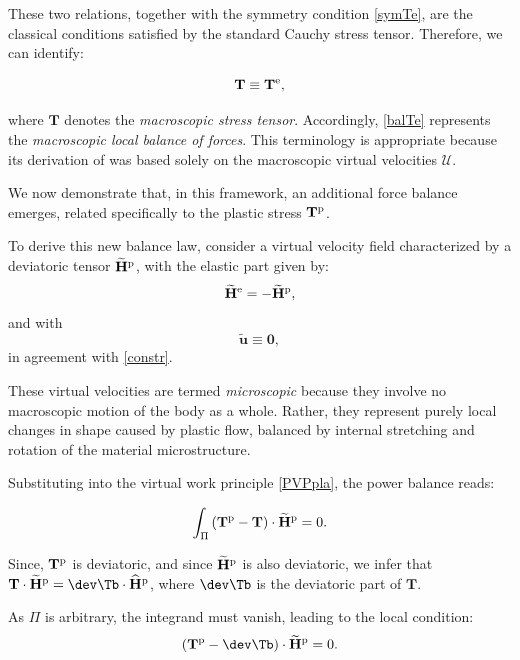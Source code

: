 These two relations, together with the symmetry condition \eqref{symTe}, are the classical conditions satisfied by the standard Cauchy stress tensor. Therefore, we can identify:
\begin{definition}
\[
\mathbf{T} \equiv \mathbf{T}^{\rm e},
\]
\end{definition}
where \( \mathbf{T} \) denotes the \textit{macroscopic stress tensor}. Accordingly, \eqref{balTe} represents the \textit{macroscopic local balance of forces}.  This terminology is appropriate because its derivation of  was based solely on the macroscopic virtual velocities \( \mathcal{U} \). 


\medskip

We now demonstrate that,  in this framework, 	an additional force balance emerges, related specifically to the plastic stress \( \mathbf{T}^{\rm p} \).


To derive this new balance law, consider a virtual velocity field characterized by a deviatoric tensor \( \widetilde{\mathbf{H}}^{\rm p} \), with the elastic part given by:
\[
\widetilde{\mathbf{H}}^{\rm e} = -\widetilde{\mathbf{H}}^{\rm p}, 
\]
and with
\[
\tilde{\mathbf{u}} \equiv \mathbf{0}, 
\]
in agreement with \eqref{constr}.

These virtual velocities are termed \emph{microscopic} because they involve no macroscopic motion of the body as a whole. Rather, they represent purely local changes in shape caused by plastic flow, balanced by internal stretching and rotation of the material microstructure.

Substituting into the virtual work principle \eqref{PVPpla}, the power balance reads:

\begin{equation}\label{vpbal}
	\int_{\Pi} \left( \mathbf{T}^{\rm p} - \mathbf{T} \right) \cdot \widetilde{\mathbf{H}}^{\rm p}  = 0.
\end{equation}

Since, \( \mathbf{T}^{\rm p} \) is deviatoric, and since \( \widetilde{\mathbf{H}}^{\rm p} \) is also deviatoric, we  infer that \( \mathbf{T} \cdot \widetilde{\mathbf{H}}^{\rm p} = \dev \Tb \cdot \widehat{\mathbf{H}}^{\rm p} \), where \( \dev \Tb \) is the deviatoric part of \( \mathbf{T} \). 

As \( \Pi \) is arbitrary, the integrand must vanish, leading to the local condition:
\[
\left( \mathbf{T}^{\rm p} - \dev \Tb \right) \cdot \widetilde{\mathbf{H}}^{\rm p} = 0.
\]

